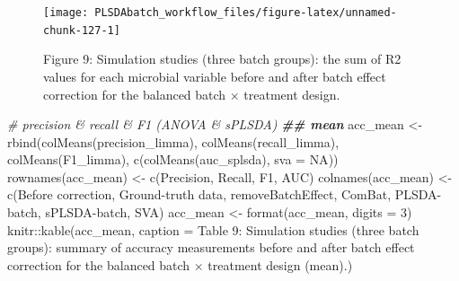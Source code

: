 \documentclass[
]{book}
\newenvironment{Shaded}{\begin{snugshade}}{\end{snugshade}}
\newcommand{\AttributeTok}[1]{\textcolor[rgb]{0.77,0.63,0.00}{#1}}
\newcommand{\CommentTok}[1]{\textcolor[rgb]{0.56,0.35,0.01}{\textit{#1}}}
\newcommand{\ConstantTok}[1]{\textcolor[rgb]{0.00,0.00,0.00}{#1}}
\newcommand{\DecValTok}[1]{\textcolor[rgb]{0.00,0.00,0.81}{#1}}
\newcommand{\DocumentationTok}[1]{\textcolor[rgb]{0.56,0.35,0.01}{\textbf{\textit{#1}}}}
\newcommand{\FunctionTok}[1]{\textcolor[rgb]{0.00,0.00,0.00}{#1}}
\newcommand{\NormalTok}[1]{#1}
\newcommand{\OtherTok}[1]{\textcolor[rgb]{0.56,0.35,0.01}{#1}}
\newcommand{\SpecialCharTok}[1]{\textcolor[rgb]{0.00,0.00,0.00}{#1}}
\newcommand{\StringTok}[1]{\textcolor[rgb]{0.31,0.60,0.02}{#1}}
\begin{document}
\begin{figure}

{\centering \texttt{[image: PLSDAbatch\_workflow\_files/figure-latex/unnamed-chunk-127-1]} 

}

\caption{Figure 9: Simulation studies (three batch groups): the sum of R2 values for each microbial variable before and after batch effect correction for the balanced batch × treatment design.}\label{fig:unnamed-chunk-127}
\end{figure}

\begin{Shaded}
\begin{Highlighting}[]
\CommentTok{\# precision \& recall \& F1 (ANOVA \& sPLSDA)}
\DocumentationTok{\#\# mean}
\NormalTok{acc\_mean }\OtherTok{\textless{}{-}} \FunctionTok{rbind}\NormalTok{(}\FunctionTok{colMeans}\NormalTok{(precision\_limma), }\FunctionTok{colMeans}\NormalTok{(recall\_limma), }
                  \FunctionTok{colMeans}\NormalTok{(F1\_limma), }\FunctionTok{c}\NormalTok{(}\FunctionTok{colMeans}\NormalTok{(auc\_splsda), }\AttributeTok{sva =} \ConstantTok{NA}\NormalTok{))}
\FunctionTok{rownames}\NormalTok{(acc\_mean) }\OtherTok{\textless{}{-}} \FunctionTok{c}\NormalTok{(}\StringTok{\textquotesingle{}Precision\textquotesingle{}}\NormalTok{, }\StringTok{\textquotesingle{}Recall\textquotesingle{}}\NormalTok{, }\StringTok{\textquotesingle{}F1\textquotesingle{}}\NormalTok{, }\StringTok{\textquotesingle{}AUC\textquotesingle{}}\NormalTok{)}
\FunctionTok{colnames}\NormalTok{(acc\_mean) }\OtherTok{\textless{}{-}} \FunctionTok{c}\NormalTok{(}\StringTok{\textquotesingle{}Before correction\textquotesingle{}}\NormalTok{, }\StringTok{\textquotesingle{}Ground{-}truth data\textquotesingle{}}\NormalTok{, }
                        \StringTok{\textquotesingle{}removeBatchEffect\textquotesingle{}}\NormalTok{, }\StringTok{\textquotesingle{}ComBat\textquotesingle{}}\NormalTok{, }
                        \StringTok{\textquotesingle{}PLSDA{-}batch\textquotesingle{}}\NormalTok{, }\StringTok{\textquotesingle{}sPLSDA{-}batch\textquotesingle{}}\NormalTok{, }\StringTok{\textquotesingle{}SVA\textquotesingle{}}\NormalTok{)}
\NormalTok{acc\_mean }\OtherTok{\textless{}{-}} \FunctionTok{format}\NormalTok{(acc\_mean, }\AttributeTok{digits =} \DecValTok{3}\NormalTok{)}
\NormalTok{knitr}\SpecialCharTok{::}\FunctionTok{kable}\NormalTok{(acc\_mean, }\AttributeTok{caption =} \StringTok{\textquotesingle{}Table 9: Simulation studies (three batch groups): summary of accuracy measurements before and after batch effect correction for the balanced batch × treatment design (mean).\textquotesingle{}}\NormalTok{)}
\end{Highlighting}
\end{Shaded}
\end{document}
